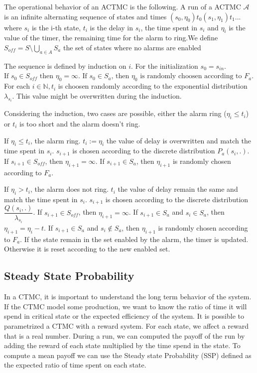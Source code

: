 The operational behavior of an ACTMC is the following. A run of a ACTMC $\mathcal{A}$ is an infinite alternating sequence of states and times $(s_0,\eta_0)t_0(s_1,\eta_1)t_1...$ where 
$s_i$ is the i-th state, 
$t_i$ is the delay in $s_i$, the time spent in $s_i$ and 
$\eta_i$ is the value of the timer, the remaining time for the alarm to ring.We define $S_{off} = S\setminus\bigcup_{a \in A} S_a$ the set of states where no alarms are enabled

The sequence is defined by induction on $i$. For the initialization $s_0 = s_{in}$. $\text{If } s_0 \in S_{off} \text{ then } \eta_0 =\infty \text{. If } s_0 \in S_{a}\text{, then } \eta_0 \text{ is randomly choosen according to }F_a$. For each $i \in \mathbb{N}, t_i$ is choosen randomly according to the exponential distribution $\lambda_{s_i}$. This value might be overwritten during the induction.

Considering the induction, two cases are possible, either the alarm ring ($\eta_i \leq t_i$) or $t_i$ is too short and the alarm doesn't ring.

If $\eta_i \leq t_i$, the alarm ring. 
$t_i := \eta_i$ the value of delay is overwritten and match the time spent in $s_i$. 
$s_{i+1}$ is chosen according to the discrete distribution $P_a(s_i,.)$. 
If $s_{i+1} \in S_{off}$, then $\eta_{i+1} =\infty$. 
If $s_{i+1} \in S_{a}$, then $\eta_{i+1}$ is randomly chosen according to $F_a$.

If $\eta_i > t_i$, the alarm does not ring. 
$t_i$ the value of delay remain the same and match the time spent in $s_i$.
$s_{i+1}$ is chosen according to the discrete distribution $\dfrac{Q(s_i,.)}{\lambda_{s_i}}$.
If $s_{i+1} \in S_{off}$, then  $\eta_{i+1} = \infty$.
If $s_{i+1} \in S_{a}$ and $s_{i} \in S_{a}$, then  $\eta_{i+1} =\eta_i - t$.
If $s_{i+1} \in S_{a}$ and $s_{i} \notin S_{a}$, then
$\eta_{i+1}$ is randomly chosen according to $F_a$. 
If the state remain in the set enabled by the alarm, the timer is updated. Otherwise it is reset according to the new enabled set.

\subsection{Steady State Probability}
In a CTMC, it is important to understand the long term behavior of the system. If the CTMC model some production, we want to know the ratio of time it will spend in critical state or the expected efficiency of the system. It is possible to parametrized a CTMC with a reward system. For each state, we affect a reward that is a real number. During a run, we can computed the payoff of the run by adding the reward of each state multiplied by the time spend in the state. To compute a mean payoff we can use the Steady state Probability (SSP) defined as the expected ratio  of time spent on each state.

